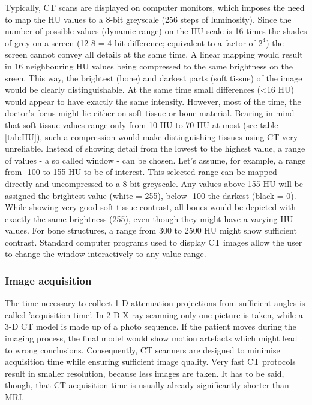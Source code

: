 Typically, CT scans are displayed on computer monitors, which imposes the need to map the HU values to a 8-bit greyscale (256 steps of luminosity).
Since the number of possible values (dynamic range) on the HU scale is 16 times the shades of grey on a screen (12-8 = 4 bit difference; equivalent to a factor of $2^4$) the screen cannot convey all details at the same time.
A linear mapping would result in 16 neighbouring HU values being compressed to the same brightness on the sreen.
This way, the brightest (bone) and darkest parts (soft tissue) of the image would be clearly distinguishable.
At the same time small differences (<16 HU) would appear to have exactly the same intensity.
However, most of the time, the doctor's focus might lie either on soft tissue or bone material.
Bearing in mind that soft tissue values range only from 10 HU to 70 HU at most (see table \ref{tab:HU}), such a compression would make distinguishing tissues using CT very unreliable.
Instead of showing detail from the lowest to the highest value, a range of values - a so called window - can be chosen.
Let's assume, for example, a range from -100 to 155 HU to be of interest.
This selected range can be mapped directly and uncompressed to a 8-bit greyscale.
Any values above 155 HU will be assigned the brightest value (white = 255), below -100 the darkest (black = 0).
While showing very good soft tissue contrast, all bones would be depicted with exactly the same brightness (255), even though they might have a varying HU values.
For bone structures, a range from 300 to 2500 HU might show sufficient contrast.
Standard computer programs used to display CT images allow the user to change the window interactively to any value range. \cite{Podgorsak, Maidment2014}

\subsubsection{Image acquisition}
The time necessary to collect 1-D attenuation projections from sufficient angles is called 'acquisition time'.
In 2-D X-ray scanning only one picture is taken, while a 3-D CT model is made up of a photo sequence.
If the patient moves during the imaging process, the final model would show motion artefacts which might lead to wrong conclusions.
Consequently, CT scanners are designed to minimise acquisition time while ensuring sufficient image quality.
Very fast CT protocols result in smaller resolution, because less images are taken.
It has to be said, though, that CT acquisition time is usually already significantly shorter than MRI. \cite{Podgorsak, Maidment2014}

